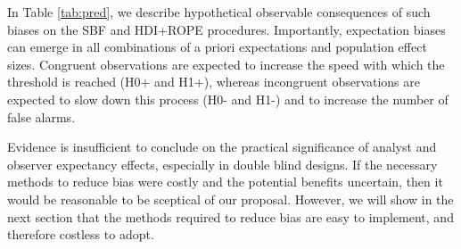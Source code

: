 \documentclass[a4paper,jou,natbib,floatsintext,donotrepeattitle]{apa6}
\begin{document}
In Table \ref{tab:pred}, we describe hypothetical observable consequences of such biases on the SBF and HDI+ROPE procedures. Importantly, expectation biases can emerge in all combinations of a priori expectations and population effect sizes. Congruent observations are expected to increase the speed with which the threshold is reached (H0+ and H1+), whereas incongruent observations are expected to slow down this process (H0- and H1-) and to increase the number of false alarms.

\vspace{5mm}

\begin{table}[t]
\centering
\caption{Possible interactions between the population value of the effect size and the a priori expectations of the experimenter during a (non-blind) sequential testing procedure.}
\label{tab:pred}
\end{table}

Evidence is insufficient to conclude on the practical significance of analyst and observer expectancy effects, especially in double blind designs. If the necessary methods to reduce bias were costly and the potential benefits uncertain, then it would be reasonable to be sceptical of our proposal. However, we will show in the next section that the methods required to reduce bias are easy to implement, and therefore costless to adopt.

\end{document}
